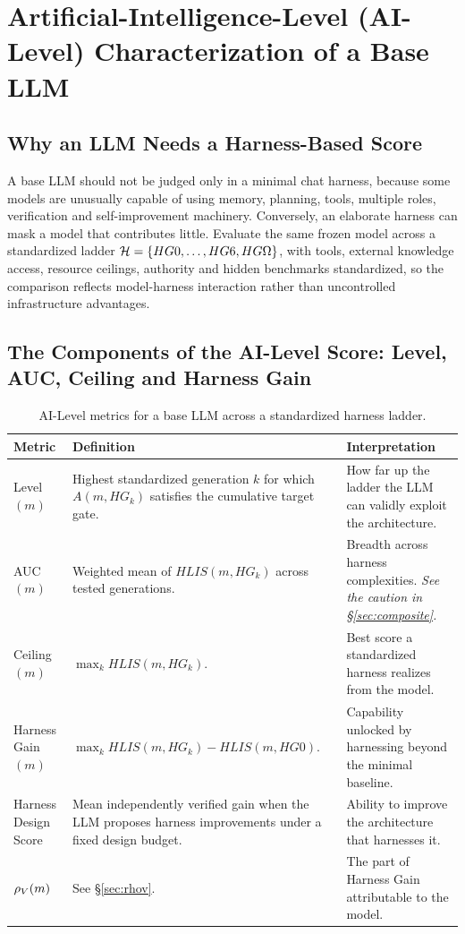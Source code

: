 \section{Artificial-Intelligence-Level (AI-Level) Characterization of a Base LLM}

\subsection{Why an LLM Needs a Harness-Based Score}

A base LLM should not be judged only in a minimal chat harness, because some models are unusually capable of using memory, planning, tools, multiple roles, verification and self-improvement machinery. Conversely, an elaborate harness can mask a model that contributes little. Evaluate the same frozen model across a standardized ladder $\mathcal{H} = \{HG0, \ldots, HG6, HG\Omega{}\}$, with tools, external knowledge access, resource ceilings, authority and hidden benchmarks standardized, so the comparison reflects model-harness interaction rather than uncontrolled infrastructure advantages.

\subsection{The Components of the AI-Level Score: Level, AUC, Ceiling and Harness Gain}

\begin{table}[!htbp]
\centering\small
\begin{tabularx}{\textwidth}{@{}lYY@{}}
\toprule
Metric & Definition & Interpretation \\
\midrule
Level$(m)$ & Highest standardized generation $k$ for which $A(m,HG_k)$ satisfies the cumulative target gate. & How far up the ladder the LLM can validly exploit the architecture. \\
AUC$(m)$ & Weighted mean of $HLIS(m,HG_k)$ across tested generations. & Breadth across harness complexities. \emph{See the caution in \S\ref{sec:composite}.} \\
Ceiling$(m)$ & $\max_k HLIS(m,HG_k)$. & Best score a standardized harness realizes from the model. \\
Harness Gain$(m)$ & $\max_k HLIS(m,HG_k) - HLIS(m,HG0)$. & Capability unlocked by harnessing beyond the minimal baseline. \\
Harness Design Score & Mean independently verified gain when the LLM proposes harness improvements under a fixed design budget. & Ability to improve the architecture that harnesses it. \\
\textbf{$\rho_V{}(m)$} & See \S\ref{sec:rhov}. & The part of Harness Gain attributable to the model. \\
\bottomrule
\end{tabularx}
\caption{AI-Level metrics for a base LLM across a standardized harness ladder.}
\label{tab:hilmetrics}
\end{table}

